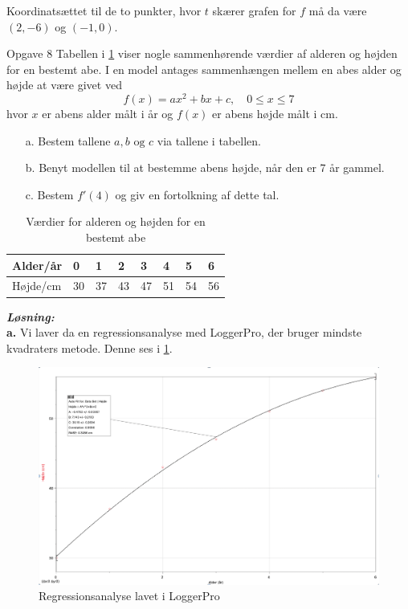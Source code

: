 \documentclass{article}
\newcommand{\sol}{\setlength{\parindent}{0cm}\textbf{\textit{Løsning:}}\setlength{\parindent}{1cm}}
\begin{document}
Koordinatsættet til de to punkter, hvor $t$ skærer grafen for $f$ må da være $(2,-6)$ og $(-1,0)$.
\begin{question}{Opgave 8}{}
  Tabellen i \cref{tab:tab} viser nogle sammenhørende værdier af alderen og højden for en bestemt abe.
  I en model antages sammenhængen mellem en abes alder og højde at være givet ved 
  \[
  f(x)= ax^2+bx+c, \quad 0 \leq x \leq 7
  \] 
  hvor $x$ er abens alder målt i år og $f(x)$ er abens højde målt i \unit{cm}.
  \begin{itemize}
    \item[a.] Bestem tallene $a, b \text{ og } c$ via tallene i tabellen. 
    \item[b.] Benyt modellen til at bestemme abens højde, når den er 7 år gammel.
    \item[c.] Bestem $f'(4)$ og giv en fortolkning af dette tal.
  \end{itemize}
\end{question}
\begin{table}[H]
\centering
\begin{tabular}{@{}llllllll@{}}
\toprule
Alder/år & 0  & 1  & 2  & 3  & 4  & 5  & 6  \\ \midrule
Højde/cm & 30 & 37 & 43 & 47 & 51 & 54 & 56 \\ \bottomrule
\end{tabular}
\caption{Værdier for alderen og højden for en bestemt abe}
\label{tab:tab}
\end{table}
\sol \\
\textbf{a.}
Vi laver da en regressionsanalyse med LoggerPro, der bruger mindste kvadraters metode.
Denne ses i \cref{fig:abe}.
\begin{figure}[H]
\begin{center}
  \includegraphics[width=\textwidth]{abe.png}
\end{center}
\caption{Regressionsanalyse lavet i LoggerPro}
\label{fig:abe}
\end{figure}
\end{document}
